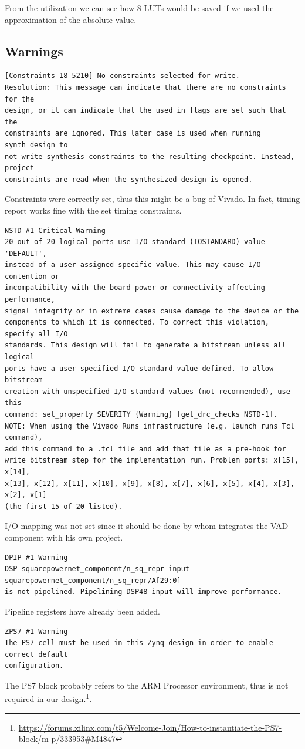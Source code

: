 From the utilization we can see how 8 LUTs would be saved if we used the 
approximation of the absolute value.

\subsection{Warnings}
{\footnotesize
\begin{verbatim}
[Constraints 18-5210] No constraints selected for write.
Resolution: This message can indicate that there are no constraints for the 
design, or it can indicate that the used_in flags are set such that the 
constraints are ignored. This later case is used when running synth_design to 
not write synthesis constraints to the resulting checkpoint. Instead, project 
constraints are read when the synthesized design is opened.
\end{verbatim}
}

Constraints were correctly set, thus this might be a bug of Vivado. 
In fact, timing report works fine with the set timing constraints.

{\footnotesize
\begin{verbatim}
NSTD #1 Critical Warning 
20 out of 20 logical ports use I/O standard (IOSTANDARD) value 'DEFAULT', 
instead of a user assigned specific value. This may cause I/O contention or 
incompatibility with the board power or connectivity affecting performance, 
signal integrity or in extreme cases cause damage to the device or the 
components to which it is connected. To correct this violation, specify all I/O
standards. This design will fail to generate a bitstream unless all logical 
ports have a user specified I/O standard value defined. To allow bitstream 
creation with unspecified I/O standard values (not recommended), use this 
command: set_property SEVERITY {Warning} [get_drc_checks NSTD-1].  
NOTE: When using the Vivado Runs infrastructure (e.g. launch_runs Tcl command), 
add this command to a .tcl file and add that file as a pre-hook for 
write_bitstream step for the implementation run. Problem ports: x[15], x[14], 
x[13], x[12], x[11], x[10], x[9], x[8], x[7], x[6], x[5], x[4], x[3], x[2], x[1] 
(the first 15 of 20 listed). 
\end{verbatim}
}

I/O mapping was not set since it should be done by whom integrates the VAD 
component with his own project.

{\footnotesize
\begin{verbatim}
DPIP #1 Warning 
DSP squarepowernet_component/n_sq_repr input squarepowernet_component/n_sq_repr/A[29:0] 
is not pipelined. Pipelining DSP48 input will improve performance. 
\end{verbatim}
}

Pipeline registers have already been added.

{\footnotesize
\begin{verbatim}
ZPS7 #1 Warning 
The PS7 cell must be used in this Zynq design in order to enable correct default
configuration. 
\end{verbatim}
}

The PS7 block probably refers to the ARM Processor environment, thus is not required
in our design.\footnote{\url{https://forums.xilinx.com/t5/Welcome-Join/How-to-instantiate-the-PS7-block/m-p/333953\#M4847}}.